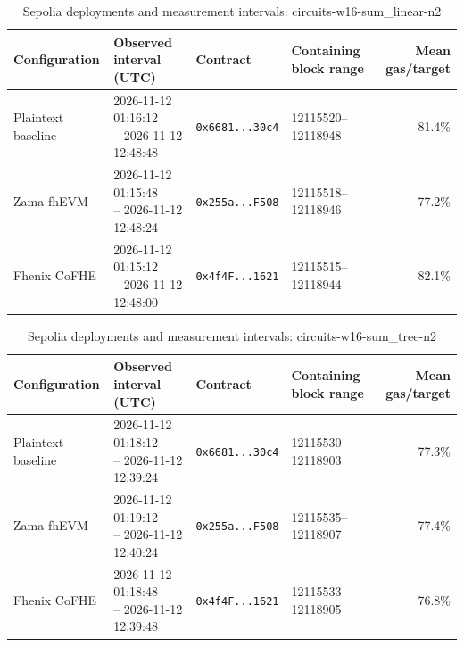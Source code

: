 \begin{table}[!t]
\caption{Sepolia deployments and measurement intervals: circuits-w16-sum\_linear-n2}
\label{tab:sepolia-circuits-w16-sum-linear-n2}
\centering
\footnotesize
\setlength{\tabcolsep}{4pt}
\begin{tabular}{|l|l|l|l|r|}
\hline
\textbf{Configuration} & \textbf{Observed interval (UTC)} & \textbf{Contract} & \textbf{Containing block range} & \textbf{Mean gas/target} \\
\hline
Plaintext baseline & \shortstack[l]{2026-11-12 01:16:12 \\ -- 2026-11-12 12:48:48} & \texttt{0x6681...30c4} & 12115520--12118948 & 81.4\% \\
\hline
Zama fhEVM & \shortstack[l]{2026-11-12 01:15:48 \\ -- 2026-11-12 12:48:24} & \texttt{0x255a...F508} & 12115518--12118946 & 77.2\% \\
\hline
Fhenix CoFHE & \shortstack[l]{2026-11-12 01:15:12 \\ -- 2026-11-12 12:48:00} & \texttt{0x4f4F...1621} & 12115515--12118944 & 82.1\% \\
\hline
\end{tabular}
\end{table}

\begin{table}[!t]
\caption{Sepolia deployments and measurement intervals: circuits-w16-sum\_tree-n2}
\label{tab:sepolia-circuits-w16-sum-tree-n2}
\centering
\footnotesize
\setlength{\tabcolsep}{4pt}
\begin{tabular}{|l|l|l|l|r|}
\hline
\textbf{Configuration} & \textbf{Observed interval (UTC)} & \textbf{Contract} & \textbf{Containing block range} & \textbf{Mean gas/target} \\
\hline
Plaintext baseline & \shortstack[l]{2026-11-12 01:18:12 \\ -- 2026-11-12 12:39:24} & \texttt{0x6681...30c4} & 12115530--12118903 & 77.3\% \\
\hline
Zama fhEVM & \shortstack[l]{2026-11-12 01:19:12 \\ -- 2026-11-12 12:40:24} & \texttt{0x255a...F508} & 12115535--12118907 & 77.4\% \\
\hline
Fhenix CoFHE & \shortstack[l]{2026-11-12 01:18:48 \\ -- 2026-11-12 12:39:48} & \texttt{0x4f4F...1621} & 12115533--12118905 & 76.8\% \\
\hline
\end{tabular}
\end{table}

